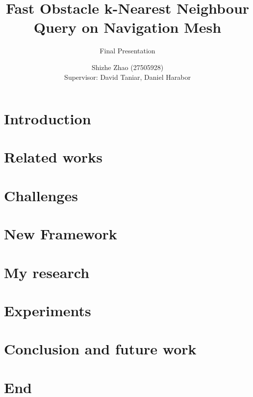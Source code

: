 \documentclass{beamer}
\title[Fast Obstacle k-Nearest Neighbour Query on Navigation Mesh]{
    Fast Obstacle k-Nearest Neighbour Query on Navigation Mesh \\
}
\subtitle {Final Presentation}
\date{}
\author[Shizhe Zhao]{
    Shizhe Zhao (27505928)\\
    Supervisor: David Taniar, Daniel Harabor
}
\begin{document}

\frame{\titlepage}
\section[]{}

\section{Introduction}

\section{Related works}

\section{Challenges}

\section{New Framework}

\section{My research}

\section{Experiments}

\section{Conclusion and future work}

\section{End}

\end{document}
